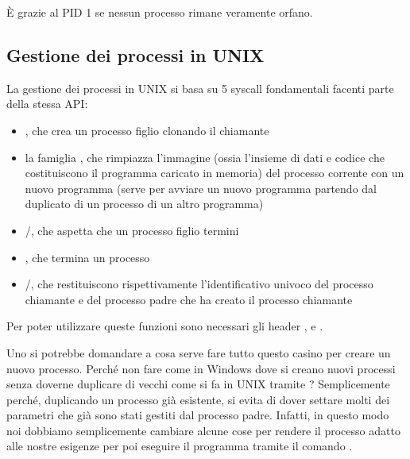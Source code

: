 \documentclass[11pt, a4paper, titlepage, oneside]{scrbook}
\begin{document}
È grazie al PID 1 se nessun processo rimane veramente orfano.

\subsection{Gestione dei processi in UNIX}

La gestione dei processi in UNIX si basa su 5 syscall fondamentali facenti parte della stessa API:
\begin{itemize}
    \item {}, che crea un processo figlio clonando il chiamante
    \item la famiglia , che rimpiazza l'immagine (ossia l'insieme di dati e codice che costituiscono il programma caricato in memoria) del processo corrente con un nuovo programma (serve per avviare un nuovo programma partendo dal duplicato di un processo di un altro programma)
    \item {}/, che aspetta che un processo figlio termini
    \item {}, che termina un processo
    \item {}/, che restituiscono rispettivamente l'identificativo univoco del processo chiamante e del processo padre che ha creato il processo chiamante
\end{itemize}
Per poter utilizzare queste funzioni sono necessari gli header ,  e . 

Uno si potrebbe domandare a cosa serve fare tutto questo casino per creare un nuovo processo. Perché non fare come in Windows dove si creano nuovi processi senza doverne duplicare di vecchi come si fa in UNIX tramite ? Semplicemente perché, duplicando un processo già esistente, si evita di dover settare molti dei parametri che già sono stati gestiti dal processo padre. Infatti, in questo modo noi dobbiamo semplicemente cambiare alcune cose per rendere il processo adatto alle nostre esigenze per poi eseguire il programma tramite il comando . 

\subsubsection*{}
\end{document}
